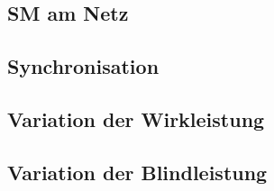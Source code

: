 \begin{flushleft}
\newpage
\section{SM am Netz}
\subsection{Synchronisation}
\subsection{Variation der Wirkleistung}
\subsection{Variation der Blindleistung}












\end{flushleft}